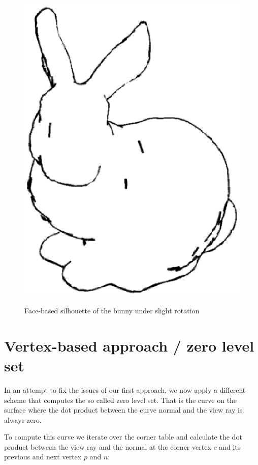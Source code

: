 \documentclass[a4paper,10pt,notitlepage]{scrreprt}
\begin{document}
\begin{figure}
{    \includegraphics[scale=0.35]{img-2-2/bunny-2.eps}}
 \caption{Face-based silhouette of the bunny under slight rotation}
 \label{fig:face-silhouette-bunny}
\end{figure}

\section{Vertex-based approach / zero level set}

In an attempt to fix the issues of our first approach, we now apply a different
scheme that computes the so called zero level set. That is the curve on the
surface where the dot product between the curve normal and the view ray is
always zero.

To compute this curve we iterate over the corner table and calculate the dot
product between the view ray and the normal at the corner vertex $c$ and its
previous and next vertex $p$ and $n$:
\end{document}
